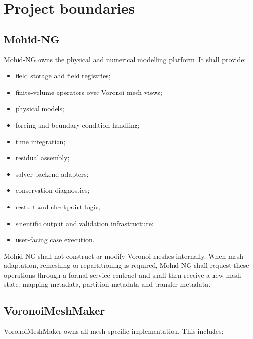 \documentclass[11pt,a4paper]{article}
\begin{document}
\section{Project boundaries}

\subsection{Mohid-NG}

Mohid-NG owns the physical and numerical modelling platform. It shall provide:

\begin{itemize}
  \item field storage and field registries;
  \item finite-volume operators over Voronoi mesh views;
  \item physical models;
  \item forcing and boundary-condition handling;
  \item time integration;
  \item residual assembly;
  \item solver-backend adapters;
  \item conservation diagnostics;
  \item restart and checkpoint logic;
  \item scientific output and validation infrastructure;
  \item user-facing case execution.
\end{itemize}

Mohid-NG shall not construct or modify Voronoi meshes internally. When mesh adaptation, remeshing or repartitioning is required, Mohid-NG shall request these operations through a formal service contract and shall then receive a new mesh state, mapping metadata, partition metadata and transfer metadata.

\subsection{VoronoiMeshMaker}

VoronoiMeshMaker owns all mesh-specific implementation. This includes:
\end{document}
